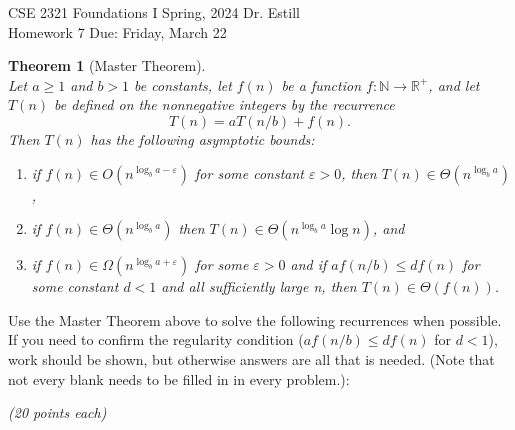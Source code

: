 \documentclass[12 pt]{amsart}
\newcommand{\Rr}{\mathbb{R}}
\newcommand{\Nn}{\mathbb{N}}
\renewcommand{\epsilon}{\varepsilon}
\newtheorem{thm}{Theorem}
\begin{document}
\begin{center} \Large
	CSE 2321 \quad Foundations I \quad Spring, 2024 \quad Dr. Estill \\ \large
	Homework 7 \quad Due: Friday, March 22
\end{center}

\vspace{3ex}

\begin{thm}[Master Theorem] \small
	\rule{0pt}{1ex} \\ Let $a \geq 1$ and $b>1$ be constants, let $f(n)$ be a function $f:\Nn \to \Rr^+$, and let $T(n)$ be defined on the nonnegative integers by the recurrence $$T(n) = aT(n/b) + f(n).$$
	Then $T(n)$ has the following asymptotic bounds:
	\begin{enumerate}[label=\arabic*.]
		\item if $f(n) \in O(n^{\log_b a - \epsilon})$ for some constant $\epsilon > 0$, then $T(n) \in \Theta(n^{\log_b a})$,
		\item if $f(n) \in \Theta(n^{\log_b a})$ then $T(n) \in \Theta(n^{\log_b a}\log n)$, and
		\item if $f(n) \in \Omega(n^{\log_b a+ \epsilon})$ for some $\epsilon>0$ and if $a f(n/b) \leq d f(n)$ for some constant $d<1$ and all sufficiently large n, then $T(n) \in \Theta(f(n))$.
	\end{enumerate}
\end{thm}

\bigskip

Use the Master Theorem above to solve the following recurrences when possible.
If you need to confirm the regularity condition (\(af(n/b) \leq df(n)\) for \(d < 1\)), work should be shown, but otherwise answers are all that is needed.
(Note that not every blank needs to be filled in in every problem.):

\emph{(20 points each)}

\bigskip
\end{document}
